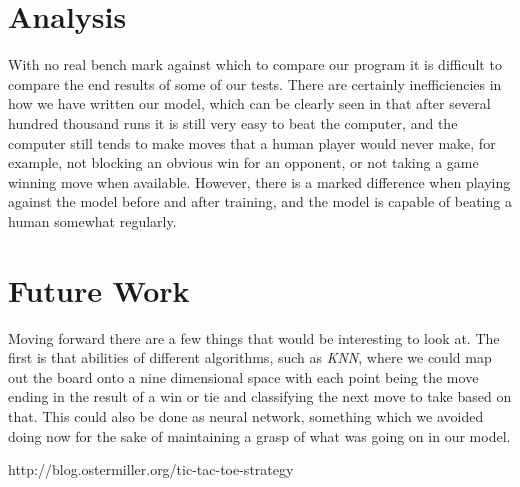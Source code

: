\documentclass{article}
\begin{document}
\section{Analysis}
With no real bench mark against which to compare our program it is difficult to compare the end results of some of our tests. There are certainly inefficiencies in how we have written our model, which can be clearly seen in that after several hundred thousand runs it is still very easy to beat the computer, and the computer still tends to make moves that a human player would never make, for example, not blocking an obvious win for an opponent, or not taking a game winning move when available. However, there is a marked difference when playing against the model before and after training, and the model is capable of beating a human somewhat regularly.

\section{Future Work}
Moving forward there are a few things that would be interesting to look at. The first is that abilities of different algorithms, such as \textit{KNN}, where we could map out the board onto a nine dimensional space with each point being the move ending in the result of a win or tie and classifying the next move to take based on that. This could also be done as neural network, something which we avoided doing now for the sake of maintaining a grasp of what was going on in our model.

http://blog.ostermiller.org/tic-tac-toe-strategy
 
\end{document}
